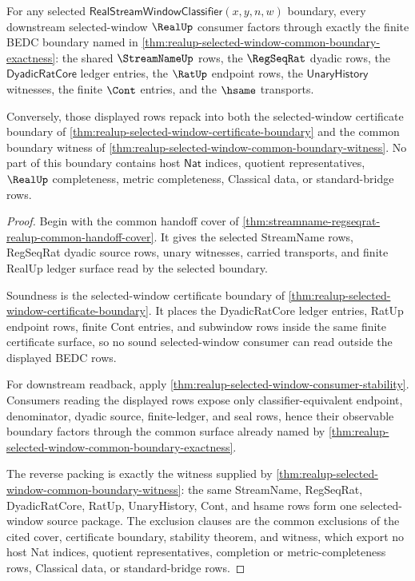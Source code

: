 \begin{theorem}
\label{thm:realup-selected-window-dyadic-regseq-streamname-boundary}
For any selected $\mathsf{RealStreamWindowClassifier}(x,y,n,w)$ boundary,
every downstream selected-window $\RealUp$ consumer factors through exactly
the finite BEDC boundary named in
\autoref{thm:realup-selected-window-common-boundary-exactness}: the shared
$\StreamNameUp$ rows, the $\RegSeqRat$ dyadic rows, the
$\mathsf{DyadicRatCore}$ ledger entries, the $\RatUp$ endpoint rows, the
$\mathsf{UnaryHistory}$ witnesses, the finite $\Cont$ entries, and the
$\hsame$ transports.

Conversely, those displayed rows repack into both the selected-window
certificate boundary of
\autoref{thm:realup-selected-window-certificate-boundary} and the common
boundary witness of
\autoref{thm:realup-selected-window-common-boundary-witness}. No part of this
boundary contains host $\mathsf{Nat}$ indices, quotient representatives,
$\RealUp$ completeness, metric completeness, Classical data, or
standard-bridge rows.
\end{theorem}
\begin{proof}
Begin with the common handoff cover of
\autoref{thm:streamname-regseqrat-realup-common-handoff-cover}. It gives the
selected StreamName rows, RegSeqRat dyadic source rows, unary witnesses,
carried transports, and finite RealUp ledger surface read by the selected
boundary.

Soundness is the selected-window certificate boundary of
\autoref{thm:realup-selected-window-certificate-boundary}. It places the
DyadicRatCore ledger entries, RatUp endpoint rows, finite Cont entries, and
subwindow rows inside the same finite certificate surface, so no sound
selected-window consumer can read outside the displayed BEDC rows.

For downstream readback, apply
\autoref{thm:realup-selected-window-consumer-stability}. Consumers reading the
displayed rows expose only classifier-equivalent endpoint, denominator, dyadic
source, finite-ledger, and seal rows, hence their observable boundary factors
through the common surface already named by
\autoref{thm:realup-selected-window-common-boundary-exactness}.

The reverse packing is exactly the witness supplied by
\autoref{thm:realup-selected-window-common-boundary-witness}: the same
StreamName, RegSeqRat, DyadicRatCore, RatUp, UnaryHistory, Cont, and hsame
rows form one selected-window source package. The exclusion clauses are the
common exclusions of the cited cover, certificate boundary, stability theorem,
and witness, which export no host Nat indices, quotient representatives,
completion or metric-completeness rows, Classical data, or standard-bridge
rows.
\end{proof}
